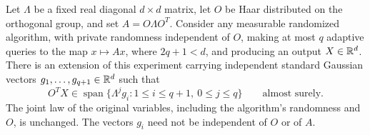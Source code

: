 \begin{lemma}\label{lem:deferred-haar}
Let $\Lambda$ be a fixed real diagonal $d\times d$ matrix, let $O$ be
Haar distributed on the orthogonal group, and set $A=O\Lambda O^T$.
Consider any measurable randomized algorithm, with private randomness
independent of $O$, making at most $q$ adaptive queries to the map $x\mapsto Ax$, where $2q+1<d$, and producing an output
$X\in\mathbb R^d$. There is an extension of this experiment carrying independent
standard Gaussian vectors $g_1,\ldots,g_{q+1}\in\mathbb R^d$ such that
\begin{equation}\label{eq:krylov-span}
 O^TX\in\operatorname{span}
 \{\Lambda^j g_i:1\le i\le q+1,\ 0\le j\le q\}
 \qquad\text{almost surely}.
\end{equation}
The joint law of the original variables, including the algorithm's
randomness and $O$, is unchanged. The vectors $g_i$ need not be
independent of $O$ or of $A$.
\end{lemma}

